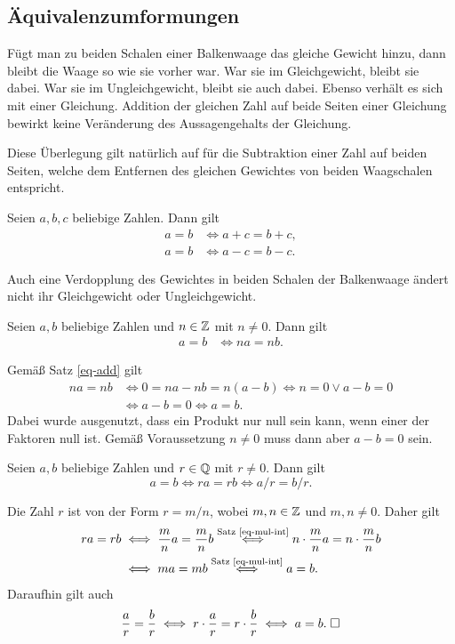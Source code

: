 \subsection{Äquivalenzumformungen}%

Fügt man zu beiden Schalen einer Balkenwaage das gleiche Gewicht
hinzu, dann bleibt die Waage so wie sie vorher war. War sie im
Gleichgewicht, bleibt sie dabei. War sie im Ungleichgewicht,
bleibt sie auch dabei. Ebenso verhält es sich mit einer Gleichung.
Addition der gleichen Zahl auf beide Seiten einer Gleichung bewirkt
keine Veränderung des Aussagengehalts der Gleichung.

Diese Überlegung gilt natürlich auf für die Subtraktion einer Zahl
auf beiden Seiten, welche dem Entfernen des gleichen Gewichtes von
beiden Waagschalen entspricht.

\begin{Satz}[Äquivalenzumformungen]\label{eq-add}
Seien $a,b,c$ beliebige Zahlen. Dann gilt
\begin{align*}
a=b&\iff a+c=b+c,\\
a=b&\iff a-c=b-c.
\end{align*}
\end{Satz}

\noindent
Auch eine Verdopplung des Gewichtes in beiden Schalen der Balkenwaage
ändert nicht ihr Gleichgewicht oder Ungleichgewicht.

\begin{Satz}[Äquivalenzumformungen]\label{eq-mul-int}
Seien $a,b$ beliebige Zahlen und $n\in\mathbb Z$ mit $n\ne 0$. Dann gilt
\begin{align*}
a=b&\iff na=nb.
\end{align*}
\end{Satz}
 Gemäß Satz \ref{eq-add} gilt
\begin{align*}
na = nb &\iff 0 = na-nb = n(a-b)\iff n=0\lor a-b=0\\
&\iff a-b=0\iff a=b.
\end{align*}
Dabei wurde ausgenutzt, dass ein Produkt nur null sein kann,
wenn einer der Faktoren null ist. Gemäß Voraussetzung $n\ne 0$ muss
dann aber $a-b=0$ sein.\;\qedsymbol

\begin{Satz}[Äquivalenzumformungen]
Seien $a,b$ beliebige Zahlen und $r\in\mathbb Q$ mit $r\ne 0$. Dann gilt
\[a=b\iff ra=rb\iff a/r=b/r.\]
\end{Satz}
Die Zahl $r$ ist von der Form $r=m/n$, wobei $m,n\in\mathbb Z$ und $m,n\ne 0$.
Daher gilt
\begin{align*}
ra=rb&\iff \frac{m}{n}a=\frac{m}{n}b
\stackrel{\text{Satz \ref{eq-mul-int}}}\iff n\cdot\frac{m}{n}a=n\cdot\frac{m}{n}b\\
&\iff ma=mb\stackrel{\text{Satz \ref{eq-mul-int}}}\iff a=b.
\end{align*}
Daraufhin gilt auch
\[\frac{a}{r}=\frac{b}{r}\iff r\cdot\frac{a}{r}=r\cdot\frac{b}{r}
\iff a=b.\;\Box\]

